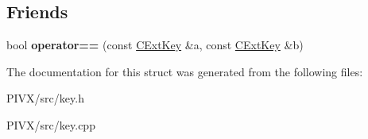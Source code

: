 \subsection*{Friends}
\begin{DoxyCompactItemize}
\item 
\mbox{\label{struct_c_ext_key_abd1d7fa4544c5a730a0d2a21d06fd3b3}} 
bool {\bfseries operator==} (const \mbox{\hyperlink{struct_c_ext_key}{C\+Ext\+Key}} \&a, const \mbox{\hyperlink{struct_c_ext_key}{C\+Ext\+Key}} \&b)
\end{DoxyCompactItemize}


The documentation for this struct was generated from the following files\+:\begin{DoxyCompactItemize}
\item 
P\+I\+V\+X/src/key.\+h\item 
P\+I\+V\+X/src/key.\+cpp\end{DoxyCompactItemize}
